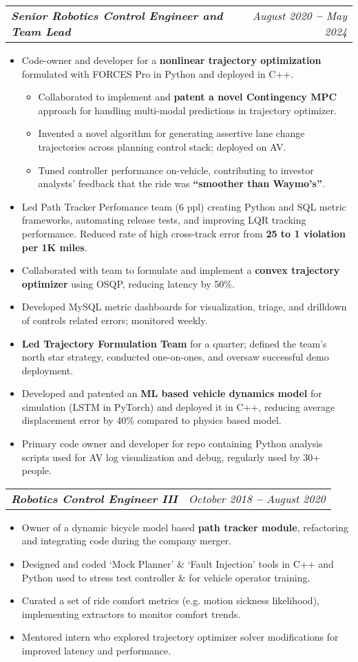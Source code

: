 \documentclass[letterpaper,11pt]{article}
\makeatletter
\def\vspaceAfterBullets{3pt} %
\def\bulletIndent{15pt} %
\newcommand{\bulletItem}[1]{
  \item\small{
    {#1}
  }
}
\newcommand{\titleAndDateHeading}[2]{
    \item
    \begin{tabular*}{1.0\textwidth}[b]{l@{\extracolsep{\fill}}r}
      \textit{\textbf{\small#1}} & \textit{\small #2}
    \end{tabular*}
}
\newcommand{\outerBulletListStart}{\begin{itemize}[leftmargin=\bulletIndent]}
\newcommand{\outerBulletListEnd}{\end{itemize}\vspace{\vspaceAfterBullets}}
\newcommand{\innerBulletListStart}{\begin{itemize}[leftmargin=\bulletIndent]}
\newcommand{\innerBulletListEnd}{\end{itemize}}
\makeatother
\begin{document}
\titleAndDateHeading
{Senior Robotics Control Engineer and Team Lead}{August 2020 \textbf{--} May 2024}
\outerBulletListStart
\bulletItem{Code-owner and developer for a \textbf{nonlinear trajectory optimization} formulated with FORCES Pro in Python and deployed in C++.}
\innerBulletListStart
\bulletItem{Collaborated to implement and \textbf{patent a novel Contingency MPC} approach for handling multi-modal predictions in trajectory optimizer.}
\bulletItem{Invented a novel algorithm for generating assertive lane change trajectories across planning control stack; deployed on AV.}
\bulletItem{Tuned controller performance on-vehicle, contributing to investor analysts’ feedback that the ride was \textbf{“smoother than Waymo’s”}.}
\innerBulletListEnd
\bulletItem{Led Path Tracker Perfomance team (6 ppl) creating Python and SQL metric frameworks, automating release tests, and improving LQR tracking performance. Reduced rate of high cross-track error from \textbf{25 to 1 violation per 1K miles}.}
\bulletItem{Collaborated with team to formulate and implement a \textbf{convex trajectory optimizer} using OSQP, reducing latency by 50\%.}
\bulletItem{Developed MySQL metric dashboards for visualization, triage, and drilldown of controls related errors; monitored weekly.}
\bulletItem{\textbf{Led Trajectory Formulation Team} for a quarter; defined the team’s north star strategy, conducted one-on-ones, and oversaw successful demo deployment.}
\bulletItem{Developed and patented an \textbf{ML based vehicle dynamics model} for simulation (LSTM in PyTorch) and deployed it in C++, reducing average displacement error by 40\% compared to physics based model.}
\bulletItem{Primary code owner and developer for repo containing Python analysis scripts used for AV log visualization and debug, regularly used by 30+ people.}
\outerBulletListEnd

\titleAndDateHeading
{Robotics Control Engineer III}{October 2018 \textbf{--} August 2020}
\outerBulletListStart
\bulletItem{Owner of a dynamic bicycle model based \textbf{path tracker module}, refactoring and integrating code during the company merger.}
\bulletItem{Designed and coded ‘Mock Planner’ \& ‘Fault Injection’ tools in C++ and Python used to stress test controller \& for vehicle operator training.}
\bulletItem{Curated a set of ride comfort metrics (e.g. motion sickness likelihood), implementing extractors to monitor comfort trends.}
\bulletItem{Mentored intern who explored trajectory optimizer solver modifications for improved latency and performance.}
\outerBulletListEnd
\end{document}
